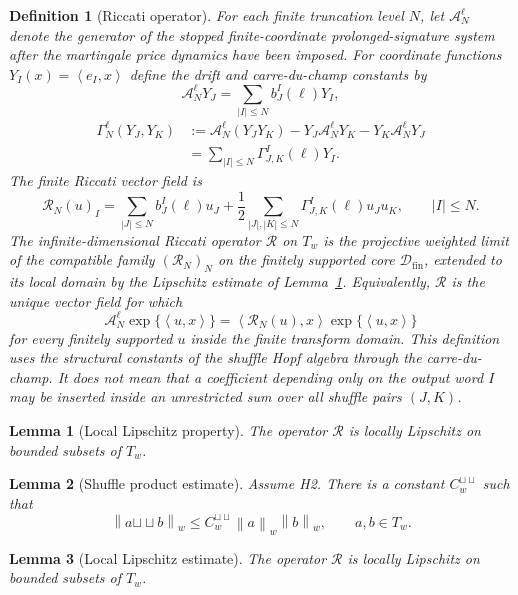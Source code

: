 \documentclass[10pt,a4paper]{amsart}
\newtheorem{definition}{Definition}
\newtheorem{lemma}{Lemma}
\newcommand{\Rs}{\mathcal R}
\newcommand{\Tw}{T_w}
\newcommand{\inner}[2]{\left\langle #1,#2\right\rangle}
\newcommand{\norm}[1]{\left\lVert #1\right\rVert}
\newcommand{\sh}{\mathbin{\sqcup\!\sqcup}}
\begin{document}
\begin{definition}[Riccati operator]\label{def:riccati}
For each finite truncation level $N$, let $\mathcal A_N^\ell$ denote the generator of the stopped finite-coordinate prolonged-signature system after the martingale price dynamics have been imposed. For coordinate functions $Y_I(x)=\inner{e_I}{x}$ define the drift and carre-du-champ constants by
\[
\mathcal A_N^\ell Y_J=\sum_{|I|\leq N} b^I_J(\ell)Y_I,
\]
\[
\begin{aligned}
\Gamma_N^\ell(Y_J,Y_K)
&:=\mathcal A_N^\ell(Y_JY_K)-Y_J\mathcal A_N^\ell Y_K-Y_K\mathcal A_N^\ell Y_J \\
&=\sum_{|I|\leq N} \Gamma^I_{J,K}(\ell)Y_I .
\end{aligned}
\]
The finite Riccati vector field is
\[
\Rs_N(u)_I=\sum_{|J|\leq N} b^I_J(\ell)u_J
+\frac12\sum_{|J|,|K|\leq N}\Gamma^I_{J,K}(\ell)u_Ju_K,
\qquad |I|\leq N.
\]
The infinite-dimensional Riccati operator $\Rs$ on $\Tw$ is the projective weighted limit of the compatible family $(\Rs_N)_N$ on the finitely supported core $\mathcal D_{\mathrm{fin}}$, extended to its local domain by the Lipschitz estimate of Lemma~\ref{lem:local-lipschitz}. Equivalently, $\Rs$ is the unique vector field for which
\[
\mathcal A_N^\ell \exp\{\inner{u}{x}\}
=\inner{\Rs_N(u)}{x}\exp\{\inner{u}{x}\}
\]
for every finitely supported $u$ inside the finite transform domain. This definition uses the structural constants of the shuffle Hopf algebra through the carre-du-champ. It does not mean that a coefficient depending only on the output word $I$ may be inserted inside an unrestricted sum over all shuffle pairs $(J,K)$.
\end{definition}

\begin{lemma}[Local Lipschitz property]\label{lem:local-lipschitz}
The operator $\Rs$ is locally Lipschitz on bounded subsets of $\Tw$.
\end{lemma}

\begin{lemma}[Shuffle product estimate]
\label{lem:shuffle-product-estimate-app}
Assume H2. There is a constant $C_w^{\sh}$ such that
\[
\norm{a\sh b}_w\leq C_w^{\sh}\norm{a}_w\norm{b}_w,
\qquad a,b\in\Tw.
\]
\end{lemma}

\begin{lemma}[Local Lipschitz estimate]
The operator $\Rs$ is locally Lipschitz on bounded subsets of $\Tw$.
\end{lemma}
\end{document}
